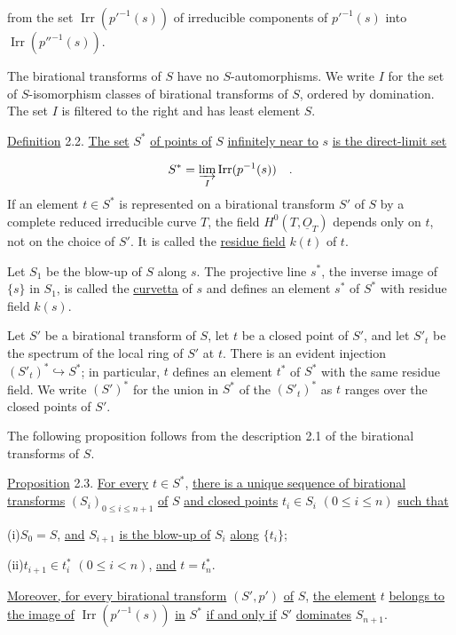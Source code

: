 from the set $\operatorname{Irr}(p'^{-1}(s))$ of irreducible components of
$p'^{-1}(s)$ into $\operatorname{Irr}(p''^{-1}(s))$.

The birational transforms of $S$ have no $S$-automorphisms.  We write $I$ for the
set of $S$-isomorphism classes of birational transforms of $S$, ordered by
domination.  The set $I$ is filtered to the right and has least element $S$.

\underline{Definition} 2.2. \underline{The set} $S^*$ \underline{of points of}
$S$ \underline{infinitely near to} $s$ \underline{is the direct-limit set}

\begin{equation*}
S^*=\varinjlim_I\operatorname{Irr}(p^{-1}(s)) \quad .
\end{equation*}
If an element $t\in S^*$ is represented on a birational transform $S'$ of $S$ by
a complete reduced irreducible curve $T$, the field
$H^0(T,\underline{O}_T)$ depends only on $t$, not on the choice of $S'$.  It is
called the \underline{residue field} $k(t)$ of $t$.

Let $S_1$ be the blow-up of $S$ along $s$.  The projective line $s^*$, the inverse
image of $\{s\}$ in $S_1$, is called the \underline{curvetta} of $s$ and defines
an element $s^*$ of $S^*$ with residue field $k(s)$.

Let $S'$ be a birational transform of $S$, let $t$ be a closed point of $S'$, and
let $S'_t$ be the spectrum of the local ring of $S'$ at $t$.  There is an evident
injection $(S'_t)^*\hookrightarrow S^*$; in particular, $t$ defines an element
$t^*$ of $S^*$ with the same residue field.  We write $(S')^*$ for the union in
$S^*$ of the $(S'_t)^*$ as $t$ ranges over the closed points of $S'$.

The following proposition follows from the description 2.1 of the birational
transforms of $S$.


\underline{Proposition} 2.3. \underline{For every} $t\in S^*$,
\underline{there is a unique sequence of birational transforms}
$(S_i)_{0\leq i\leq n+1}$ \underline{of} $S$ \underline{and closed points}
$t_i\in S_i$ $(0\leq i\leq n)$ \underline{such that}

(i)\quad $S_0=S$, \underline{and} $S_{i+1}$ \underline{is the blow-up of} $S_i$
\underline{along} $\{t_i\}$;

(ii)\quad $t_{i+1}\in t_i^*$ $(0\leq i<n)$, \underline{and} $t=t_n^*$.

\underline{Moreover, for every birational transform} $(S',p')$ \underline{of}
$S$, \underline{the element} $t$ \underline{belongs to the image of}
$\operatorname{Irr}(p'^{-1}(s))$ \underline{in} $S^*$ \underline{if and only if}
$S'$ \underline{dominates} $S_{n+1}$.

